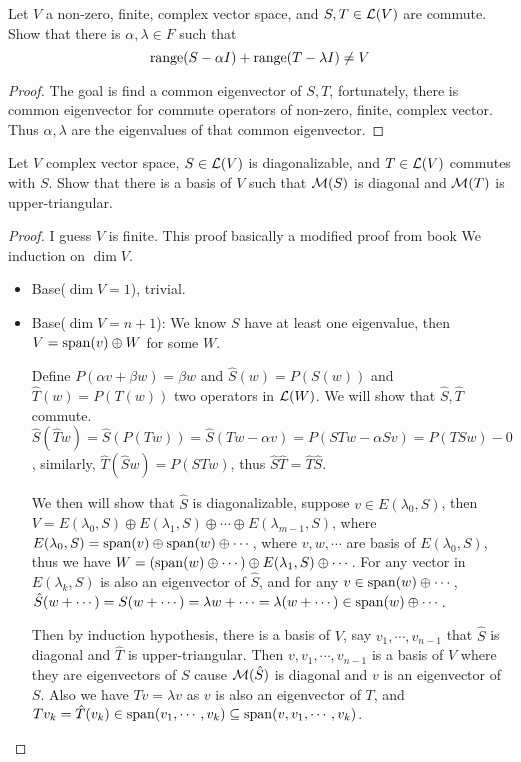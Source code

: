 \documentclass[../main.tex]{subfiles}
\begin{document}
\begin{exercise}
  Let $V$ a non-zero, finite, complex vector space, and $S, T \in \mathcal{L}(V)$
  are commute. Show that there is $\alpha, \lambda \in F$
  such that
  \[
  \operatorname{range}(S - \alpha I) + \operatorname{range}(T - \lambda I) \neq V
  \]
\end{exercise}
\begin{proof}
  The goal is find a common eigenvector of $S, T$, fortunately,
  there is common eigenvector for commute operators of non-zero, finite,
  complex vector. Thus $\alpha, \lambda$ are the eigenvalues of that common
  eigenvector.
\end{proof}

\begin{exercise}
  Let $V$ complex vector space, $S \in \mathcal{L}(V)$ is diagonalizable,
  and $T \in \mathcal{L}(V)$ commutes with $S$.
  Show that there is a basis of $V$ such that
  $\mathcal{M}(S)$ is diagonal and $\mathcal{M}(T)$ is upper-triangular.
\end{exercise}
\begin{proof}
  I guess $V$ is finite. This proof basically a modified proof from book We induction on $\dim V$.
  \begin{itemize}
    \item Base($\dim V = 1$), trivial.
    \item Base($\dim V = n + 1$): We know $S$ have at least one eigenvalue,
          then $V = \operatorname{span}(v) \oplus W$ for some $W$.

          Define $P(\alpha v + \beta w) = \beta w$ and $\hat{S}(w) = P(S(w))$ and
          $\hat{T}(w) = P(T(w))$ two operators in $\mathcal{L}(W)$. We will
          show that $\hat{S}, \hat{T}$ commute.
          $\hat{S}(\hat{T}w) = \hat{S}(P(Tw)) = \hat{S}(Tw - \alpha v) = P(STw - \alpha Sv) = P(TSw) - 0$,
          similarly, $\hat{T}(\hat{S}w) = P(STw)$, thus $\hat{S}\hat{T} = \hat{T}\hat{S}$.

          We then will show that $\hat{S}$ is diagonalizable,
          suppose $v \in E(\lambda_0, S)$, then
          $V = E(\lambda_0, S) \oplus E(\lambda_1, S) \oplus \cdots \oplus E(\lambda_{m - 1}, S)$,
          where $E(\lambda_0, S) = \operatorname{span}(v) \oplus \operatorname{span}(w) \oplus \cdots$,
          where $v, w, \cdots$ are basis of $E(\lambda_0, S)$,
          thus we have $W = (\operatorname{span}(w) \oplus \cdots) \oplus E(\lambda_1, S) \oplus \cdots$.
          For any vector in $E(\lambda_k, S)$ is also an eigenvector of $\hat{S}$,
          and for any $v \in \operatorname{span}(w) \oplus \cdots$, $\hat{S}(w + \cdots) = S(w + \cdots) = \lambda w + \cdots = \lambda (w + \cdots) \in \operatorname{span}(w) \oplus \cdots$.

          Then by induction hypothesis, there is a basis of $V$, say $v_1, \cdots, v_{n - 1}$
          that $\hat{S}$ is diagonal and $\hat{T}$ is upper-triangular.
          Then $v, v_1, \cdots, v_{n - 1}$ is a basis of $V$ where they are
          eigenvectors of $S$ cause $\mathcal{M}(\hat{S})$ is diagonal and $v$ is an eigenvector of $S$.
          Also we have $Tv = \lambda v$ as $v$ is also an eigenvector of $T$, and $Tv_k = \hat{T}(v_k) \in \operatorname{span}(v_1, \cdots, v_k) \subseteq \operatorname{span}(v, v_1, \cdots, v_k)$.
  \end{itemize}
\end{proof}
\end{document}
